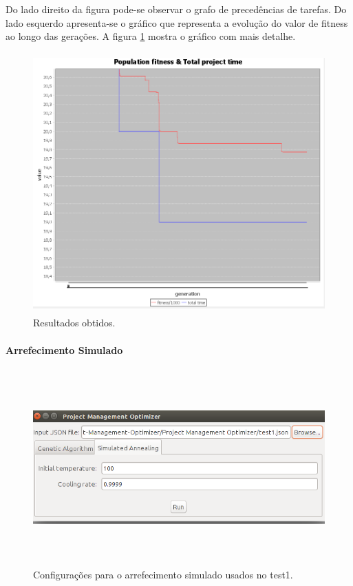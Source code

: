 \begin{titlepage}
Do lado direito da figura pode-se observar o grafo de precedências de tarefas. Do lado esquerdo apresenta-se o gráfico que representa a evolução do valor de fitness ao longo das gerações. A figura \ref{exp1Zoom} mostra o gráfico com mais detalhe.

\begin{figure}[H]
  \centering
    \includegraphics[width=14cm, height = 10cm]{exp1Zoom.png}
  \caption{Resultados obtidos.}
  \label{exp1Zoom}
\end{figure}

\paragraph{Arrefecimento Simulado}

\begin{figure}[H]
  \centering
    \includegraphics[width=18cm, height = 7.5cm]{sa_config_exp1.png}
  \caption{Configurações para o arrefecimento simulado usados no test1.}
  \label{sa_config_teste1}
\end{figure}


\end{titlepage}

